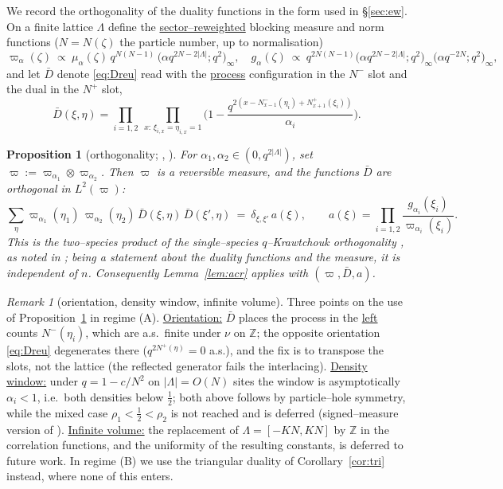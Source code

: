 \documentclass[11pt]{article}
\theoremstyle{plain}
\newtheorem{proposition}[theorem]{Proposition}
\theoremstyle{definition}
\theoremstyle{remark}
\newtheorem{remark}[theorem]{Remark}
\newcommand{\Z}{\mathbb{Z}}\newcommand{\R}{\mathbb{R}}\newcommand{\N}{\mathbb{N}}
\begin{document}
We record the orthogonality of the duality functions in the form used in
\S\ref{sec:ew}. On a finite lattice $\Lambda$ define the \underline{sector--reweighted}
blocking measure and norm functions ($N=N(\zeta)$ the particle number, up to
normalisation)
\begin{equation}\label{eq:omegadef}
  \varpi_\alpha(\zeta)\ \propto\ \mu_\alpha(\zeta)\,q^{N(N-1)}\,
  \big(\alpha q^{2N-2|\Lambda|};q^2\big)_\infty,\quad
  g_\alpha(\zeta)\ \propto\ q^{2N(N-1)}
  \big(\alpha q^{2N-2|\Lambda|};q^2\big)_\infty\big(\alpha q^{-2N};q^2\big)_\infty,
\end{equation}
and let $\bar D$ denote \eqref{eq:Dreu} read with the \underline{process} configuration in
the $N^-$ slot and the dual in the $N^+$ slot,
\[
  \bar D(\xi,\eta)=\prod_{i=1,2}\ \prod_{x:\,\xi_{i,x}=\eta_{i,x}=1}
  \Big(1-\frac{q^{2\left(x-N^-_{x-1}(\eta_i)+N^+_{x+1}(\xi_i)\right)}}{\alpha_i}\Big).
\]

\begin{proposition}[orthogonality; {\cite[Thm.~3.2]{CFG20}}, {\cite[\S3.1]{REU}}]
\label{prop:orth}
For $\alpha_1,\alpha_2\in(0,q^{2|\Lambda|})$, set
$\varpi:=\varpi_{\alpha_1}\otimes\varpi_{\alpha_2}$. Then $\varpi$ is a reversible
measure, and the functions $\bar D$ are orthogonal in $L^2(\varpi)$:
\begin{equation}\label{eq:orthexact}
  \sum_\eta \varpi_{\alpha_1}(\eta_1)\,\varpi_{\alpha_2}(\eta_2)\,
  \bar D(\xi,\eta)\,\bar D(\xi',\eta)\ =\ \delta_{\xi,\xi'}\,a(\xi),\qquad
  a(\xi)=\prod_{i=1,2}\frac{g_{\alpha_i}(\xi_i)}{\varpi_{\alpha_i}(\xi_i)}.
\end{equation}
This is the two--species product of the single--species $q$--Krawtchouk orthogonality
\cite[Thm.~3.2]{CFG20}, as noted in \cite[\S3.1]{REU}; being a statement about the
duality functions and the measure, it is independent of $n$. Consequently
Lemma~\ref{lem:acr} applies with $(\varpi,\bar D,a)$.
\end{proposition}

\begin{remark}[orientation, density window, infinite volume]\label{rem:orthstatus}
Three points on the use of Proposition~\ref{prop:orth} in regime (A). \underline{Orientation:}
$\bar D$ places the process in the \underline{left} counts $N^-(\eta_i)$, which are a.s.\
finite under $\nu$ on $\Z$; the opposite orientation \eqref{eq:Dreu} degenerates there
($q^{2N^+(\eta)}=0$ a.s.), and the fix is to transpose the slots, not the lattice (the
reflected generator fails the interlacing). \underline{Density window:} under $q=1-c/N^2$ on
$|\Lambda|=O(N)$ sites the window is asymptotically $\alpha_i<1$, i.e.\ both densities
below $\tfrac12$; both above follows by particle--hole symmetry, while the mixed case
$\rho_1<\tfrac12<\rho_2$ is not reached and is deferred (signed--measure version of
\cite[Thm.~3.2]{CFG20}). \underline{Infinite volume:} the replacement of $\Lambda=[-KN,KN]$
by $\Z$ in the correlation functions, and the uniformity of the resulting constants,
is deferred to future work. In regime (B) we use the triangular duality of
Corollary~\ref{cor:tri} instead, where none of this enters.
\end{remark}
\end{document}
